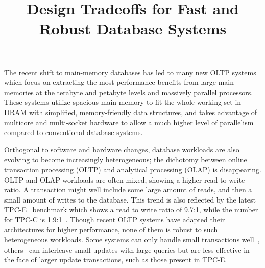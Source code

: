 \documentclass[preprint]{sig-alternate-nocprt}
\begin{document}

\title{Design Tradeoffs for Fast and Robust Database Systems}

\author{
\alignauthor
}

\maketitle
The recent shift to main-memory databases has led to many new OLTP systems~\cite{HStore,Hyper,Hekaton,Silo} which focus on extracting the most performance benefits from large main memories at the terabyte and petabyte levels and massively parallel processors. These systems utilize spacious main memory to fit the whole working set in DRAM with simplified, memory-friendly data structures, and takes advantage of multicore and multi-socket hardware to allow a much higher level of parallelism compared to conventional database systems.

Orthogonal to software and hardware changes, database workloads are also evolving to become increasingly heterogeneous; the dichotomy between online transaction processing (OLTP) and analytical processing (OLAP) is disappearing. OLTP and OLAP workloads are often mixed, showing a higher read to write ratio. A transaction might well include some large amount of reads, and then a small amount of writes to the database. This trend is also reflected by the latest TPC-E~\cite{TPC-E} benchmark which shows a read to write ratio of 9.7:1, while the number for TPC-C is 1.9:1~\cite{TPC-Compare}. Though recent OLTP systems have adapted their architectures for higher performance, none of them is robust to such heterogeneous workloads. Some systems can only handle small transactions well~\cite{HStore}, others~\cite{Hyper,Hekaton,Silo} can interleave small updates with large queries but are less effective in the face of larger update transactions, such as those present in TPC-E.
\end{document}
